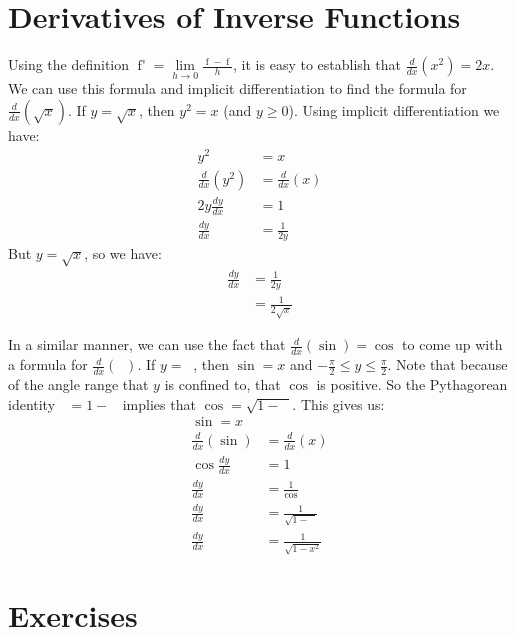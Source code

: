\documentclass[12pt,]{book}
\theoremstyle{plain}
\theoremstyle{definition}
\numberwithin{equation}{section}
\newcommand{\fe}[2]{\mathop{{#1}{\left(#2\right)}}}
\newcommand{\fd}[1]{#1'}
\newcommand{\lz}[2]{\frac{d#1}{d#2}}
\newcommand{\lzoo}[2]{{\frac{d}{d#1}}{\left(#2\right)}}
\begin{document}
\section[Derivatives of Inverse Functions]{Derivatives of Inverse Functions}\label{section-derivatives-of-inverse-functions}
Using the definition \(\fe{\fd{f}}{x}=\lim\limits_{h\to0}\frac{\fe{f}{x+h}-\fe{f}{h}}{h}\), it is easy to establish that \(\lzoo{x}{x^2}=2x\). We can use this formula and implicit differentiation to find the formula for \(\lzoo{x}{\sqrt{x}}\).  If \(y=\sqrt{x}\), then \(y^2=x\) (and \(y\geq0\)). Using implicit differentiation we have:\begin{align*}
y^2&=x\\
\lzoo{x}{y^2}&=\lzoo{x}{x}\\
2y\lz{y}{x}&=1\\
\lz{y}{x}&=\frac{1}{2y}
\end{align*}But \(y=\sqrt{x}\), so we have:\begin{align*}
\lz{y}{x}&=\frac{1}{2y}\\
&=\frac{1}{2\sqrt{x}}
\end{align*}%
\par
In a similar manner, we can use the fact that \(\lzoo{x}{\fe{\sin}{x}}=\fe{\cos}{x}\) to come up with a formula for \(\lzoo{x}{\fe{\sin^{-1}}{x}}\). If \(y=\fe{\sin^{-1}}{x}\), then \(\fe{\sin}{y}=x\) and \(-\frac{\pi}{2}\leq y\leq \frac{\pi}{2}\). Note that because of the angle range that \(y\) is confined to, that \(\fe{\cos}{y}\) is positive. So the Pythagorean identity \(\fe{\cos^2}{y}=1-\fe{\sin^2}{y}\) implies that \(\fe{\cos}{y}=\sqrt{1-\fe{\sin^2}{y}}\). This gives us:\begin{align*}
\fe{\sin}{y}=x\\
\lzoo{x}{\fe{\sin}{y}}&=\lzoo{x}{x}\\
\fe{\cos}{y}\lz{y}{x}&=1\\
\lz{y}{x}&=\frac{1}{\fe{\cos}{y}}\\
\lz{y}{x}&=\frac{1}{\sqrt{1-\fe{\sin^2}{y}}}\\
\lz{y}{x}&=\frac{1}{\sqrt{1-x^2}}
\end{align*}%
\typeout{************************************************}
\typeout{************************************************}
\section*{Exercises}\label{exercises-45}
\end{document}
